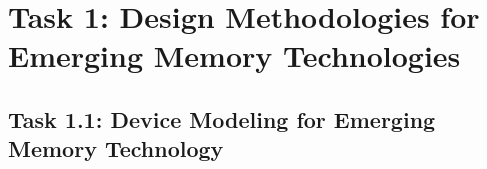 \section{Task 1: Design Methodologies for Emerging Memory Technologies}





\subsection{Task 1.1: Device Modeling for Emerging Memory Technology}

